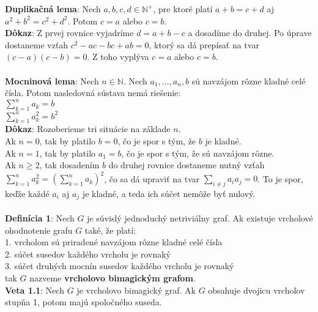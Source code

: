 \documentclass[12pt]{article}
\begin{document}
\textbf{Duplikačná lema}: Nech $a,b,c,d \in \mathbb{N^+}$, pre ktoré platí $a + b = c + d$ aj $a^2 + b^2 = c^2 + d^2$. Potom $c = a$ alebo $c = b$. \\
 
\textbf{Dôkaz}: Z prvej rovnice vyjadríme $d = a + b - c$ a dosadíme do druhej. Po úprave dostaneme vzťah $c^2 - ac - bc + ab = 0$, ktorý sa dá prepísať na tvar $(c - a)(c - b) = 0$. Z toho vyplýva $c = a$ alebo $c = b$. \\\\

\textbf{Mocninová lema}: Nech $n \in \mathbb{N}$. Nech $a_1, ... , a_n , b$ sú navzájom rôzne kladné celé čísla. Potom nasledovná sústava nemá riešenie: \\
$\sum_{k=1}^{n} a_k = b$ \\
$\sum_{k=1}^{n} a^2_k = b^2$ \\

\textbf{Dôkaz}: Rozoberieme tri situácie na základe $n$. \\

Ak $n = 0$, tak by platilo $b = 0$, čo je spor s tým, že $b$ je kladné. \\

Ak $n = 1$, tak by platilo $a_1 = b$, čo je spor s tým, že sú navzájom rôzne. \\

Ak $n \geq 2$, tak dosadením $b$ do druhej rovnice dostaneme nutný vzťah $\sum_{k=1}^{n} a^2_k = (\sum_{k=1}^{n} a_k)^2$, čo sa dá upraviť na tvar $\sum_{i \neq j} a_i a_j = 0$. To je spor, keďže každé $a_i$ aj $a_j$ je kladné, a teda ich súčet nemôže byť nulový. \\\\


\textbf{Definícia 1}: Nech $G$ je súvislý jednoduchý netriviálny graf. Ak existuje vrcholové ohodnotenie grafu $G$ také, že platí: \\
1. vrcholom sú priradené navzájom rôzne kladné celé čísla \\
2. súčet susedov každého vrcholu je rovnaký \\
3. súčet druhých mocnín susedov každého vrcholu je rovnaký \\
tak $G$ nazveme \textbf{vrcholovo bimagickým grafom}. \\

\textbf{Veta 1.1}: Nech $G$ je vrcholovo bimagický graf. Ak $G$ obsahuje dvojicu vrcholov stupňa 1, potom majú spoločného suseda. \\
\end{document}
